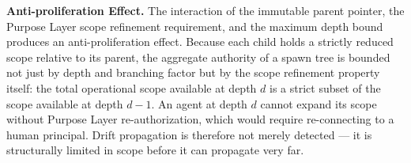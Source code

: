 \bigskip
\noindent\textbf{Anti-proliferation Effect.} The interaction of the immutable parent pointer, the Purpose Layer scope refinement requirement, and the maximum depth bound produces an anti-proliferation effect. Because each child holds a strictly reduced scope relative to its parent, the aggregate authority of a spawn tree is bounded not just by depth and branching factor but by the scope refinement property itself: the total operational scope available at depth $d$ is a strict subset of the scope available at depth $d-1$. An agent at depth $d$ cannot expand its scope without Purpose Layer re-authorization, which would require re-connecting to a human principal. Drift propagation is therefore not merely detected — it is structurally limited in scope before it can propagate very far.


